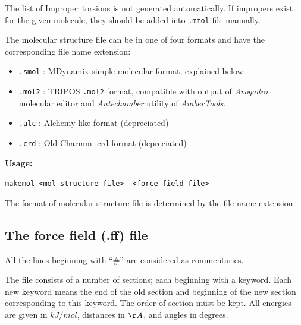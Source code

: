 \documentclass{article}
\begin{document}
The list of Improper torsions is not generated automatically. If impropers
exist for the given molecule, they should be added into \verb|.mmol| file 
manually. 

The molecular structure file can be in one of four formats and have the 
corresponding file name extension:

\begin{itemize}
\item
\verb|.smol| : MDynamix simple molecular format, explained below
\item
\verb|.mol2| : TRIPOS \verb|.mol2| format, compatible with output of 
{\it Avogadro} molecular editor and {\it Antechamber} utility of {\it AmberTools}. 
\item
\verb|.alc| : Alchemy-like format (depreciated)
\item
\verb|.crd| : Old Charmm .crd format (depreciated)
\end{itemize}

{\bf Usage:}

\verb|makemol <mol structure file>  <force field file>|

The format of molecular structure file is determined by the file name extension.

\subsection{The force field (.ff) file}

All the lines beginning with ``\#'' are considered as commentaries.

The file consists of a number of sections; each beginning with a keyword.
Each new keyword means the end of the old section and beginning of the 
new section corresponding to this keyword. The order of section must be kept. 
All energies are given in $kJ/mol$, distances in $\AA$, and angles in degrees.
\end{document}
